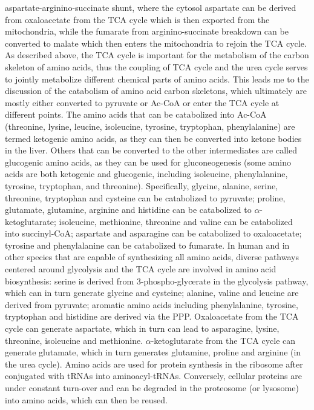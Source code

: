 \documentclass[12pt,twoside,openany,\mydriver]{thesis}  %
\begin{document}
aspartate-arginino-succinate shunt, where the cytosol aspartate can be derived from oxaloacetate from the TCA cycle which is then exported from the mitochondria, while the fumarate from arginino-succinate breakdown can be converted to malate which then enters the mitochondria to rejoin the TCA cycle. As described above, the TCA cycle is important for the metabolism of the carbon skeleton of amino acids, thus the coupling of TCA cycle and the urea cycle serves to jointly metabolize different chemical parts of amino acids. This leads me to the discussion of the catabolism of amino acid carbon skeletons, which ultimately are mostly either converted to pyruvate or Ac-CoA or enter the TCA cycle at different points. The amino acids that can be catabolized into Ac-CoA (threonine, lysine, leucine, isoleucine, tyrosine, tryptophan, phenylalanine) are termed ketogenic amino acids, as they can then be converted into ketone bodies in the liver. Others that can be converted to the other intermediates are called glucogenic amino acids, as they can be used for gluconeogenesis (some amino acids are both ketogenic and glucogenic, including isoleucine, phenylalanine, tyrosine, tryptophan, and threonine). Specifically, glycine, alanine, serine, threonine, tryptophan and cysteine can be catabolized to pyruvate; proline, glutamate, glutamine, arginine and histidine can be catabolized to \(\alpha\)-ketoglutarate; isoleucine, methionine, threonine and valine can be catabolized into succinyl-CoA; aspartate and asparagine can be catabolized to oxaloacetate; tyrosine and phenylalanine can be catabolized to fumarate. In human and in other species that are capable of synthesizing all amino acids, diverse pathways centered around glycolysis and the TCA cycle are involved in amino acid biosynthesis: serine is derived from 3-phospho-glycerate in the glycolysis pathway, which can in turn generate glycine and cysteine; alanine, valine and leucine are derived from pyruvate; aromatic amino acids including phenylalanine, tyrosine, tryptophan and histidine are derived via the PPP. Oxaloacetate from the TCA cycle can generate aspartate, which in turn can lead to asparagine, lysine, threonine, isoleucine and methionine. \(\alpha\)-ketoglutarate from the TCA cycle can generate glutamate, which in turn generates glutamine, proline and arginine (in the urea cycle). Amino acids are used for protein synthesis in the ribosome after conjugated with tRNAs into aminoacyl-tRNAs. Conversely, cellular proteins are under constant turn-over and can be degraded in the proteosome (or lysosome) into amino acids, which can then be reused.
\end{document}
